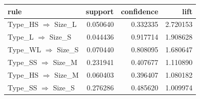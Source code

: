 \begin{tabular}{lrrr}
\toprule
rule & support & confidence & lift \\
\midrule
Type\_HS $\Rightarrow$ Size\_L & 0.050640 & 0.332335 & 2.720153 \\
Type\_L $\Rightarrow$ Size\_S & 0.044436 & 0.917714 & 1.908628 \\
Type\_WL $\Rightarrow$ Size\_S & 0.070440 & 0.808095 & 1.680647 \\
Type\_SS $\Rightarrow$ Size\_M & 0.231941 & 0.407677 & 1.110890 \\
Type\_HS $\Rightarrow$ Size\_M & 0.060403 & 0.396407 & 1.080182 \\
Type\_SS $\Rightarrow$ Size\_S & 0.276286 & 0.485620 & 1.009974 \\
\bottomrule
\end{tabular}
